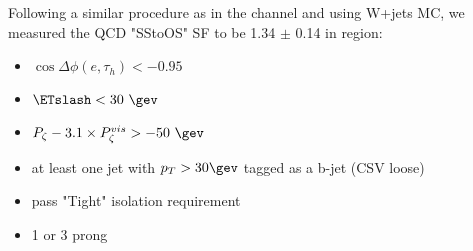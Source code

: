 Following a similar procedure as in the \thth channel and using W+jets MC, 
we measured the QCD "SStoOS" SF to be 1.34 $\pm$ 0.14 in region:
\begin{itemize}
  \item $\cos{\Delta \phi (e,\tau_{h})}<-0.95$
  \item $\ETslash<30~\gev$
  \item $P_{\zeta}- 3.1 \times P_{\zeta}^{vis} > -50~\gev$
  \item at least one jet with $p_T>30\gev$ tagged as a b-jet (CSV loose)
  \item \tauh pass "Tight" isolation requirement
  \item 1 or 3 prong \tauh
\end{itemize}


